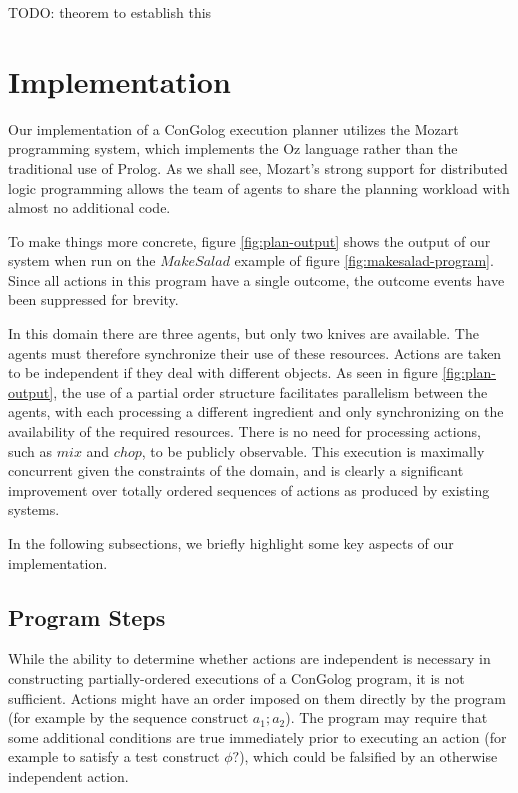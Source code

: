 TODO: theorem to establish this


\section{Implementation\label{sec:JointExec:Implementation}}

Our implementation of a ConGolog execution planner utilizes the Mozart
programming system, which implements the Oz language \citep{vanroy99mozart}
rather than the traditional use of Prolog. As we shall see, Mozart's
strong support for distributed logic programming allows the team of
agents to share the planning workload with almost no additional code.

To make things more concrete, figure \ref{fig:plan-output} shows
the output of our system when run on the $MakeSalad$ example of figure
\ref{fig:makesalad-program}. Since all actions in this program have
a single outcome, the outcome events have been suppressed for brevity.

In this domain there are three agents, but only two knives are available.
The agents must therefore synchronize their use of these resources.
Actions are taken to be independent if they deal with different objects.
As seen in figure \ref{fig:plan-output}, the use of a partial order
structure facilitates parallelism between the agents, with each processing
a different ingredient and only synchronizing on the availability
of the required resources. There is no need for processing actions,
such as $mix$ and $chop$, to be publicly observable. This execution
is maximally concurrent given the constraints of the domain, and is
clearly a significant improvement over totally ordered sequences of
actions as produced by existing systems.

In the following subsections, we briefly highlight some key aspects
of our implementation.


\subsection{Program Steps}

While the ability to determine whether actions are independent is
necessary in constructing partially-ordered executions of a ConGolog
program, it is not sufficient. Actions might have an order imposed
on them directly by the program (for example by the sequence construct
$a_{1};a_{2}$). The program may require that some additional conditions
are true immediately prior to executing an action (for example to
satisfy a test construct $\phi?$), which could be falsified by an
otherwise independent action.

